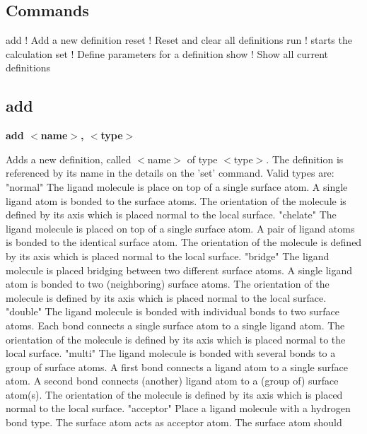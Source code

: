 \subsection*{Commands}
\begin{MacVerbatim}
add     ! Add a new definition
reset   ! Reset and clear all definitions
run     ! starts the calculation
set     ! Define parameters for a definition
show    ! Show all current definitions
\end{MacVerbatim}
\subsection*{add}
{\bf add $ <$name$> $, $ <$type$> $ \par }
\vspace{3pt}
Adds a new definition, called $ <$name$> $ of type $ <$type$> $. 
The definition is referenced by its name in the details on the 'set' command. 
Valid types are: 
"normal"   The ligand molecule is place on top of a single surface atom. 
           A single ligand atom is bonded to the surface atoms. 
           The orientation of the molecule is defined by its axis which is 
           placed normal to the local surface. 
"chelate"  The ligand molecule is placed on top of a single surface atom. 
           A pair of ligand atoms is bonded to the identical surface atom. 
           The orientation of the molecule is defined by its axis which is 
           placed normal to the local surface. 
"bridge"   The ligand molecule is placed bridging between two different 
           surface atoms. 
           A single ligand atom is bonded to two (neighboring) surface atoms. 
           The orientation of the molecule is defined by its axis which is 
           placed normal to the local surface. 
"double"   The ligand molecule is bonded with individual bonds to two surface 
           atoms. Each bond connects a single surface atom to a single 
           ligand atom. 
           The orientation of the molecule is defined by its axis which is 
           placed normal to the local surface. 
"multi"    The ligand molecule is bonded with several bonds to a group of 
           surface atoms. 
           A first bond connects a ligand atom to a single surface atom. 
           A second bond connects (another) ligand atom to 
           a (group of) surface atom(s). 
           The orientation of the molecule is defined by its axis which is 
           placed normal to the local surface. 
"acceptor" Place a ligand molecule with a hydrogen bond type. 
           The surface atom acts as acceptor atom. The surface atom should 
